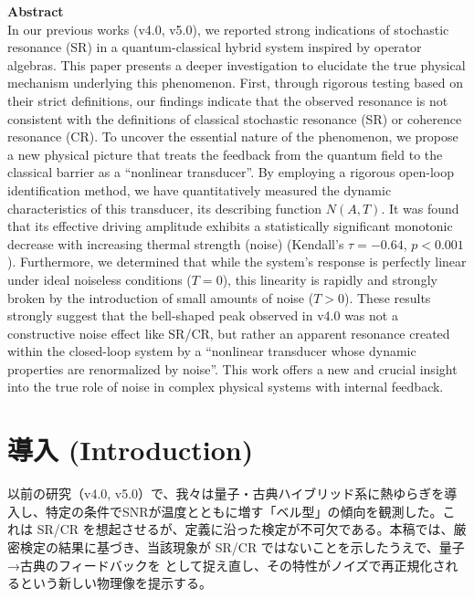 \documentclass[a4paper,11pt,ja=standard,lualatex]{bxjsarticle}
\begin{document}
\vspace{1em}
\noindent\textbf{Abstract}\\
\small
In our previous works (v4.0, v5.0), we reported strong indications of stochastic resonance (SR) in a quantum-classical hybrid system inspired by operator algebras. This paper presents a deeper investigation to elucidate the true physical mechanism underlying this phenomenon. First, through rigorous testing based on their strict definitions, our findings indicate that the observed resonance is not consistent with the definitions of classical stochastic resonance (SR) or coherence resonance (CR)\cite{Gammaitoni1998,Lindner2004}. To uncover the essential nature of the phenomenon, we propose a new physical picture that treats the feedback from the quantum field to the classical barrier as a ``nonlinear transducer''. By employing a rigorous open-loop identification method, we have quantitatively measured the dynamic characteristics of this transducer, its describing function $N(A,T)$\cite{Gelb1968,Khalil2002}. It was found that its effective driving amplitude exhibits a statistically significant monotonic decrease with increasing thermal strength (noise) (Kendall's $\tau=-0.64$, $p<0.001$)\cite{Kendall1938,Sen1968,Efron1979}. Furthermore, we determined that while the system's response is perfectly linear under ideal noiseless conditions ($T=0$), this linearity is rapidly and strongly broken by the introduction of small amounts of noise ($T>0$). These results strongly suggest that the bell-shaped peak observed in v4.0 was not a constructive noise effect like SR/CR, but rather an apparent resonance created within the closed-loop system by a ``nonlinear transducer whose dynamic properties are renormalized by noise''. This work offers a new and crucial insight into the true role of noise in complex physical systems with internal feedback.
\normalsize

\FloatBarrier

\section{導入 (Introduction)}
以前の研究（v4.0, v5.0）で、我々は量子・古典ハイブリッド系に熱ゆらぎを導入し、特定の条件でSNRが温度とともに増す「ベル型」の傾向を観測した。これは SR/CR を想起させるが、定義に沿った検定が不可欠である\cite{Gammaitoni1998,Lindner2004}。本稿では、厳密検定の結果に基づき、当該現象が SR/CR ではないことを示したうえで、量子→古典のフィードバックを  として捉え直し、その特性がノイズで再正規化されるという新しい物理像を提示する。
\end{document}
